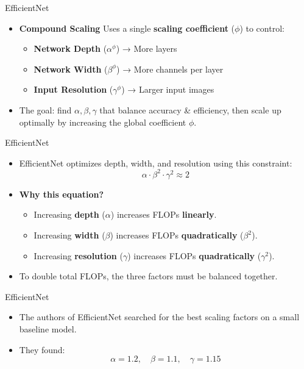 \begin{frame}{EfficientNet}
    \begin{itemize}
        \item \textbf{Compound Scaling} Uses a single \textbf{scaling coefficient} (\(\phi\)) to control:
        \begin{itemize}
        \item \textbf{Network Depth} (\(\alpha^\phi\)) → More layers
        \item \textbf{Network Width} (\(\beta^\phi\)) → More channels per layer
        \item \textbf{Input Resolution} (\(\gamma^\phi\)) → Larger input images
    \end{itemize}
        \item The goal: find \(\alpha, \beta, \gamma\) that balance accuracy \& efficiency, then scale up optimally by increasing the global coefficient \(\phi\).
    \end{itemize}

\end{frame}

\begin{frame}{EfficientNet}
\begin{itemize}
    \item EfficientNet optimizes depth, width, and resolution using this constraint:
    \[
    \alpha \cdot \beta^2 \cdot \gamma^2 \approx 2
    \]
    \item \textbf{Why this equation?}
    \begin{itemize}
        \item Increasing \textbf{depth} (\(\alpha\)) increases FLOPs \textbf{linearly}.
        \item Increasing \textbf{width} (\(\beta\)) increases FLOPs \textbf{quadratically} (\(\beta^2\)).
        \item Increasing \textbf{resolution} (\(\gamma\)) increases FLOPs \textbf{quadratically} (\(\gamma^2\)).
    \end{itemize}
    \item To double total FLOPs, the three factors must be balanced together.
\end{itemize}
\end{frame}



\begin{frame}{EfficientNet}
\begin{itemize}
    \item The authors of EfficientNet searched for the best scaling factors on a small baseline model.
    \item They found:
    \[
    \alpha = 1.2, \quad \beta = 1.1, \quad \gamma = 1.15
    \]
\end{itemize}
\end{frame}

